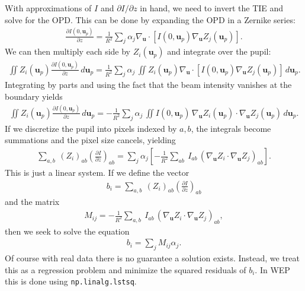 \documentclass[TS,authoryear,toc]{lsstdoc}
\begin{document}
With approximations of $I$ and $\partial I / \partial z$ in hand, we need to invert the TIE and solve for the OPD.
This can be done by expanding the OPD in a Zernike series:
\begin{align}
    \frac{\partial I(0, \mathbf{u}_p)}{\partial z} =
    \frac{1}{R^2} \sum_j \alpha_j
        \nabla_\mathbf{u} \cdot [I(0, \mathbf{u}_p) \nabla_\mathbf{u} Z_j(\mathbf{u}_p)].
\end{align}
We can then multiply each side by $Z_i(\mathbf{u}_p)$ and integrate over the pupil:
\begin{align}
    \iint Z_i(\mathbf{u}_p) \frac{\partial I(0, \mathbf{u}_p)}{\partial z} \, d\mathbf{u}_p =
    \frac{1}{R^2} \sum_j \alpha_j \, \iint Z_i(\mathbf{u}_p) \nabla_\mathbf{u} \cdot [I(0, \mathbf{u}_p) \nabla_\mathbf{u} Z_j(\mathbf{u}_p)] \, d\mathbf{u}_p.
\end{align}
Integrating by parts and using the fact that the beam intensity vanishes at the boundary yields
\begin{align}
    \iint Z_i(\mathbf{u}_p) \frac{\partial I(0, \mathbf{u}_p)}{\partial z} \, d\mathbf{u}_p =
    -\frac{1}{R^2} \sum_j \alpha_j \, \iint I(0, \mathbf{u}_p) \, \nabla_\mathbf{u} Z_i(\mathbf{u}_p) \cdot \nabla_\mathbf{u} Z_j(\mathbf{u}_p) \, d\mathbf{u}_p.
\end{align}
If we discretize the pupil into pixels indexed by $a, b$, the integrals become summations and the pixel size cancels, yielding
\begin{align}
    \sum_{a, b} ~ (Z_i)_{ab} \left(\frac{\partial I}{\partial z}\right)_{ab} =
    \sum_j \alpha_j \left[
        -\frac{1}{R^2} \sum_{ab} ~ I_{ab} \, (\nabla_\mathbf{u} Z_i \cdot \nabla_\mathbf{u} Z_j)_{ab}
    \right].
\end{align}
This is just a linear system.
If we define the vector
\begin{align}
    b_i = \sum_{a, b} ~ (Z_i)_{ab} \left(\frac{\partial I}{\partial z}\right)_{ab}
    \label{eq:exp-vector}
\end{align}
and the matrix
\begin{align}
    M_{ij} = -\frac{1}{R^2} \sum_{a,b} ~ I_{ab} \, (\nabla_\mathbf{u} Z_i \cdot \nabla_\mathbf{u} Z_j)_{ab},
    \label{eq:exp-matrix}
\end{align}
then we seek to solve the equation
\begin{align}
    b_i = \sum_j M_{ij} \alpha_j.
    \label{eq:exp-system}
\end{align}
Of course with real data there is no guarantee a solution exists.
Instead, we treat this as a regression problem and minimize the squared residuals of $b_i$.
In WEP this is done using \texttt{np.linalg.lstsq}.
\end{document}
